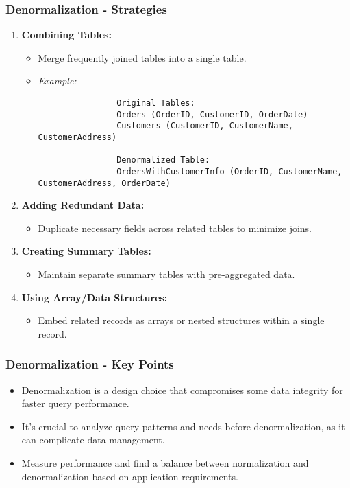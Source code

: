 \documentclass[aspectratio=169]{beamer}
\begin{document}
\begin{frame}[fragile]
    \frametitle{Denormalization - Strategies}
    \begin{enumerate}
        \item \textbf{Combining Tables:}
            \begin{itemize}
                \item Merge frequently joined tables into a single table.
                \item \textit{Example:}
                \begin{lstlisting}
                Original Tables:
                Orders (OrderID, CustomerID, OrderDate)
                Customers (CustomerID, CustomerName, CustomerAddress)

                Denormalized Table:
                OrdersWithCustomerInfo (OrderID, CustomerName, CustomerAddress, OrderDate)
                \end{lstlisting}
            \end{itemize}

        \item \textbf{Adding Redundant Data:}
            \begin{itemize}
                \item Duplicate necessary fields across related tables to minimize joins.
            \end{itemize}

        \item \textbf{Creating Summary Tables:}
            \begin{itemize}
                \item Maintain separate summary tables with pre-aggregated data.
            \end{itemize}

        \item \textbf{Using Array/Data Structures:}
            \begin{itemize}
                \item Embed related records as arrays or nested structures within a single record.
            \end{itemize}
    \end{enumerate}
\end{frame}

\begin{frame}[fragile]
    \frametitle{Denormalization - Key Points}
    \begin{itemize}
        \item Denormalization is a design choice that compromises some data integrity for faster query performance.
        \item It's crucial to analyze query patterns and needs before denormalization, as it can complicate data management.
        \item Measure performance and find a balance between normalization and denormalization based on application requirements.
    \end{itemize}
\end{frame}
\end{document}
